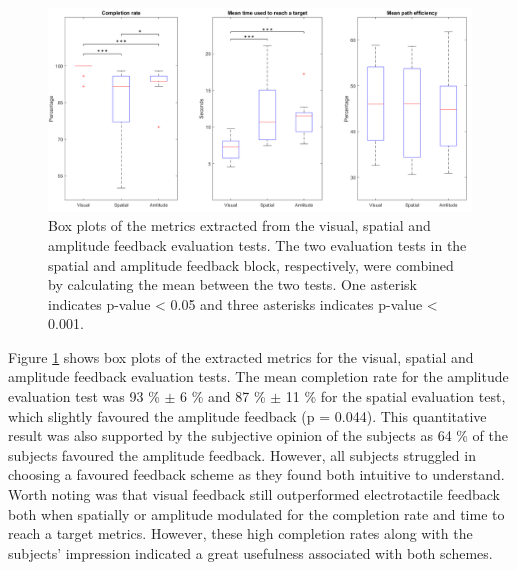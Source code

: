 \begin{figure}[h]                 
	\includegraphics[width=1\textwidth]{figures/boxplot_results}
	\caption{Box plots of the metrics extracted from the visual, spatial and amplitude feedback evaluation tests. The two evaluation tests in the spatial and amplitude feedback block, respectively, were combined by calculating the mean between the two tests. One asterisk indicates p-value < 0.05 and three asterisks indicates p-value < 0.001.}
	\label{fig:pa:boxplot_results} 
\end{figure}
Figure \ref{fig:pa:boxplot_results} shows box plots of the extracted metrics for the visual, spatial and amplitude feedback evaluation tests. The mean completion rate for the amplitude evaluation test was 93 \% $\pm$ 6 \% and 87 \% $\pm$ 11 \% for the spatial evaluation test, which slightly favoured the amplitude feedback (p = 0.044). This quantitative result was also supported by the subjective opinion of the subjects as 64 \% of the subjects favoured the amplitude feedback. However, all subjects struggled in choosing a favoured feedback scheme as they found both intuitive to understand. Worth noting was that visual feedback still outperformed electrotactile feedback both when spatially or amplitude modulated for the completion rate and time to reach a target metrics. However, these high completion rates along with the subjects' impression indicated a great usefulness associated with both schemes.  


